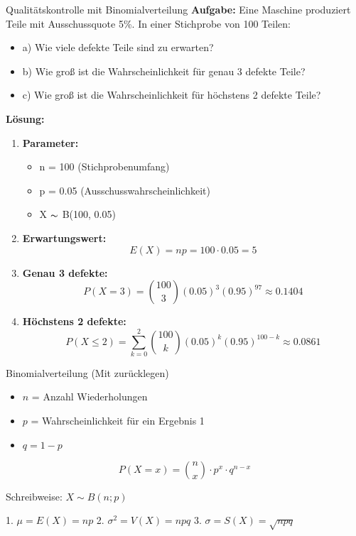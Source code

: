 \begin{example}{Qualitätskontrolle mit Binomialverteilung}
\textbf{Aufgabe:} Eine Maschine produziert Teile mit Ausschussquote 5\%. In einer Stichprobe von 100 Teilen:
\begin{itemize}
\item a) Wie viele defekte Teile sind zu erwarten?
\item b) Wie groß ist die Wahrscheinlichkeit für genau 3 defekte Teile?
\item c) Wie groß ist die Wahrscheinlichkeit für höchstens 2 defekte Teile?
\end{itemize}

\textbf{Lösung:}
\begin{enumerate}
\item \textbf{Parameter:}
   \begin{itemize}
   \item n = 100 (Stichprobenumfang)
   \item p = 0.05 (Ausschusswahrscheinlichkeit)
   \item X $\thicksim$ B(100, 0.05)
   \end{itemize}

\item \textbf{Erwartungswert:}
   $$E(X) = np = 100 \cdot 0.05 = 5$$

\item \textbf{Genau 3 defekte:}
   $$P(X=3) = \binom{100}{3}(0.05)^3(0.95)^{97} \approx 0.1404$$

\item \textbf{Höchstens 2 defekte:}
   $$P(X \leq 2) = \sum_{k=0}^2 \binom{100}{k}(0.05)^k(0.95)^{100-k} \approx 0.0861$$
\end{enumerate}
\end{example}

\begin{definition}{Binomialverteilung (Mit zurücklegen)}
\begin{itemize}
  \item $n$ = Anzahl Wiederholungen
  \item $p$ = Wahrscheinlichkeit für ein Ergebnis 1
  \item $q = 1-p$
\end{itemize}

$$P(X=x) = \binom{n}{x} \cdot p^x \cdot q^{n-x}$$

Schreibweise: $X \sim B(n;p)$

1. $\mu = E(X) = np$
2. $\sigma^2 = V(X) = npq$
3. $\sigma = S(X) = \sqrt{npq}$
\end{definition}

